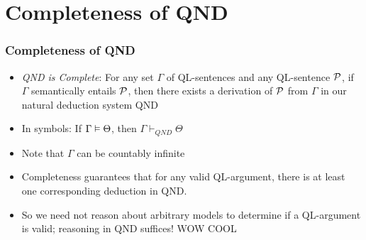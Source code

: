 \setcounter{section}{12}
\section{Completeness of QND}

\begin{frame}

\scriptsize{\tableofcontents}

\end{frame}

\begin{frame}
\frametitle{Completeness of QND}

\begin{itemize}[<+->]

\item \emph{QND is Complete}: For any set $\Gamma$  of QL-sentences and any QL-sentence $\mathcal{P}$, if $\Gamma$ semantically entails $\mathcal{P}$, then there exists a derivation of $\mathcal{P}$ from $\Gamma$ in our natural deduction system QND

\bi

\item In symbols: If $\Gamma \vDash \Theta$, then $\Gamma \vdash_{QND} \Theta$
\item Note that $\Gamma$ can be countably infinite 

\ei


\bigskip

\item Completeness guarantees that for any valid QL-argument, there is at least one corresponding deduction in QND. 

\item So we need not reason about arbitrary models to determine if a QL-argument is valid; reasoning in QND suffices! WOW COOL

\end{itemize}
\end{frame}


